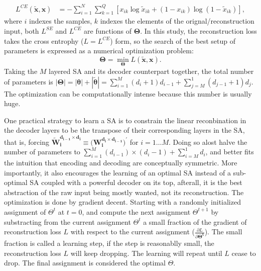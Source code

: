 \begin{equation} \label{eq:CE}
\begin{split}
  L^{CE}(\boldsymbol{\tilde{x}},\boldsymbol{x}) &= -\sum_{i=1}^N\sum_{k=1}^Q[x_{ik}\log{\tilde{x}_{ik}}+(1-x_{ik})\log(1-\tilde{x}_{ik})],
\end{split}
\end{equation}
where $i$ indexes the samples, $k$ indexes the elements of the orignal/reconstruction input, both $L^{SE}$ and $L^{CE}$ are functions of $\boldsymbol{\Theta}$. In this study, the reconstruction loss takes the cross entrophy ($L=L^{CE}$) form, so the search of the best setup of parameters is expressed as a numerical optimization problem:
\[ \boldsymbol{\Theta} = \min_{\boldsymbol{\Theta}} L(\boldsymbol{\tilde{x}},\boldsymbol{x}). \]
Taking the $M$ layered SA and its decoder counterpart together, the total number of parameters is $|\boldsymbol{\Theta}| = |\boldsymbol{\theta}| + |\boldsymbol{\tilde{\theta}}| = \sum_{i=1}^{M}{(d_i + 1)d_{i-1}} + \sum_{j=M}^{1}{(d_{j-1} + 1)d_j}$. The optimization can be computationally intense because this number is usually huge.

One practical strategy to learn a SA is to constrain the linear reconbination in the decoder layers to be the transpose of their corresponding layers in the SA, that is, forcing $\boldsymbol{\tilde{W}_i^{d_{i-1} \times d_i}} \equiv (\boldsymbol{W_i^{d_i \times d_{i-1}})^{\prime}}$ for $i=1 \ldots M$. Doing so alost halve the number of parameters to $\sum_{i=1}^{M}{(d_{i-1}) \times (d_i - 1)} + \sum_{i=M}^{1}{d_i}$, and better fits the intuition that encoding and decoding are conceptually symmetric. More importantly, it also encourages the learning of an optimal SA instead of a sub-optimal SA coupled with a powerful decoder on its top, afterall, it is the best abstraction of the raw input being mostly wanted, not its reconstruction. 
The optimization is done by gradient decent. Starting with a randomly initialized assignment of $\Theta^t$ at $t=0$, and compute the next assignment $\Theta^{t+1}$ by substracting from the current assignment $\Theta^t$ a small fraction of the gradient of reconstruction loss $L$ with respect to the current assignment ($\frac{\partial L}{\partial \boldsymbol{\Theta^{t}}}$). The small fraction is called a learning step, if the step is reasonablly small, the reconstruction loss $L$ will keep dropping. The learning will repeat until $L$ cease to drop. The final assignment is considered the optimal $\Theta$. 

